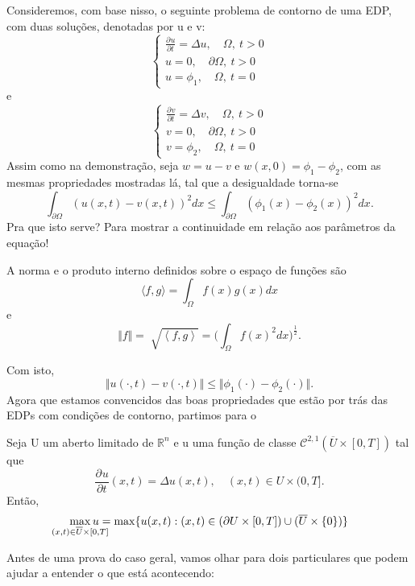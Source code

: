 \documentclass[../pde_notes.tex]{subfiles}
\begin{document}
Consideremos, com base nisso, o seguinte problema de contorno de uma EDP, com duas soluções, denotadas por u e v:
\[
	\left\{\begin{array}{ll}
		\frac{\partial^{}u}{\partial t^{}}=\Delta u,\quad  \Omega ,\: t>0 \\
		u = 0, \quad  \partial \Omega ,\: t > 0                           \\
		u = \phi _1,\quad  \Omega ,\: t = 0
	\end{array}\right.
\]
e
\[
	\left\{\begin{array}{ll}
		\frac{\partial^{}v}{\partial t^{}}=\Delta v,\quad  \Omega ,\: t>0 \\
		v = 0, \quad  \partial \Omega ,\: t > 0                           \\
		v = \phi _2,\quad  \Omega ,\: t = 0
	\end{array}\right.
\]
Assim como na demonstração, seja \(w = u - v\) e \(w(x, 0) = \phi_1-\phi_2\), com as mesmas propriedades mostradas lá, tal que a desigualdade torna-se
\[
	\int_{\partial \Omega }^{}(u(x, t)-v(x, t))^{2} dx \leq \int_{\partial \Omega }^{}(\phi_1(x)-\phi_2(x))^{2}dx.
\]
Pra que isto serve? Para mostrar a continuidade em relação aos parâmetros da equação!   \begin{tcolorbox}[
		skin=enhanced,
		title=Lembrete!,
		after title={\hfill Produto Interno de Funções},
		fonttitle=\bfseries,
		sharp corners=downhill,
		colframe=black,
		colbacktitle=yellow!75!white,
		colback=yellow!30,
		colbacklower=black,
		coltitle=black,
		drop large lifted shadow
	]
	A norma e o produto interno definidos sobre o espaço de funções são
	\[
		\langle f, g \rangle= \int_{\Omega }^{}f(x)g(x)dx
	\]
	e
	\[
		\Vert f \Vert = \sqrt[]{\left< f, g \right>} = \biggl(\int_{\Omega }^{}f(x)^{2}dx\biggr)^{\frac{1}{2}}.
	\]
\end{tcolorbox}

Com isto,
\[
	\Vert u(\cdot , t)-v(\cdot , t) \Vert\leq \Vert \phi_1(\cdot )-\phi_2(\cdot ) \Vert.
\]
Agora que estamos convencidos das boas propriedades que estão por trás das EDPs com condições de contorno, partimos para o
\hypertarget{strong_maximum}{
	\begin{theorem*}
		Seja U um aberto limitado de \(\mathbb{R}^{n}\) e u uma função de classe \(\mathcal{C}^{2, 1}(\overline{U} \times [0, T])\) tal que
		\[
			\frac{\partial^{}u}{\partial t^{}}(x, t)=\Delta u(x, t),\quad (x, t)\in U\times (0, T].
		\]
		Então,
		\[
			\max_{\mathclap{(x, t)\in \overline{U}\times [0,T]}}u =\max_{}\{u(x, t):(x, t)\in(\partial U\times [0,T])\cup (\overline{U}\times \{0\})\}
		\]
	\end{theorem*}
}
Antes de uma prova do caso geral, vamos olhar para dois particulares que podem ajudar a entender o que está acontecendo:
\end{document}
